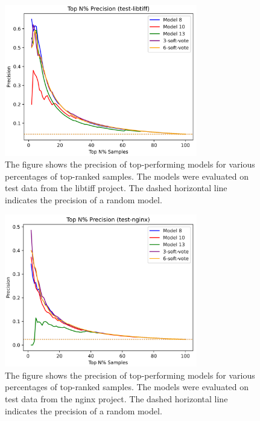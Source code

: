 \begin{figure}[ht]
	\centering
	\includegraphics[width=0.75\textwidth]{figures/topn-libtiff.png}
	\caption{The figure shows the precision of top-performing models for various percentages of top-ranked samples. The models were evaluated on test data from the libtiff project. The dashed horizontal line indicates the precision of a random model.}
	\label{figure:topn-libtiff}
\end{figure}

\begin{figure}[ht]
	\centering
	\includegraphics[width=0.75\textwidth]{figures/topn-nginx.png}
	\caption{The figure shows the precision of top-performing models for various percentages of top-ranked samples. The models were evaluated on test data from the nginx project. The dashed horizontal line indicates the precision of a random model.}
	\label{figure:topn-nginx}
\end{figure}


